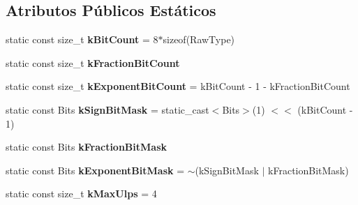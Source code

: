 \subsection*{Atributos Públicos Estáticos}
\begin{DoxyCompactItemize}
\item 
\hypertarget{classtesting_1_1internal_1_1FloatingPoint_ab819d2e8f93e9e482373999f0f8d71b9}{static const size\-\_\-t {\bfseries k\-Bit\-Count} = 8$\ast$sizeof(Raw\-Type)}\label{classtesting_1_1internal_1_1FloatingPoint_ab819d2e8f93e9e482373999f0f8d71b9}

\item 
static const size\-\_\-t {\bfseries k\-Fraction\-Bit\-Count}
\item 
\hypertarget{classtesting_1_1internal_1_1FloatingPoint_a1973d843c00781053d3073daa8a40119}{static const size\-\_\-t {\bfseries k\-Exponent\-Bit\-Count} = k\-Bit\-Count -\/ 1 -\/ k\-Fraction\-Bit\-Count}\label{classtesting_1_1internal_1_1FloatingPoint_a1973d843c00781053d3073daa8a40119}

\item 
\hypertarget{classtesting_1_1internal_1_1FloatingPoint_aca98b5ea6f2222a66a82e52421682efa}{static const Bits {\bfseries k\-Sign\-Bit\-Mask} = static\-\_\-cast$<$Bits$>$(1) $<$$<$ (k\-Bit\-Count -\/ 1)}\label{classtesting_1_1internal_1_1FloatingPoint_aca98b5ea6f2222a66a82e52421682efa}

\item 
static const Bits {\bfseries k\-Fraction\-Bit\-Mask}
\item 
\hypertarget{classtesting_1_1internal_1_1FloatingPoint_a66065dfc4d5f41100f686159637af23b}{static const Bits {\bfseries k\-Exponent\-Bit\-Mask} = $\sim$(k\-Sign\-Bit\-Mask $\vert$ k\-Fraction\-Bit\-Mask)}\label{classtesting_1_1internal_1_1FloatingPoint_a66065dfc4d5f41100f686159637af23b}

\item 
\hypertarget{classtesting_1_1internal_1_1FloatingPoint_aac498b3714d93f8e88cdc30e4c5935f6}{static const size\-\_\-t {\bfseries k\-Max\-Ulps} = 4}\label{classtesting_1_1internal_1_1FloatingPoint_aac498b3714d93f8e88cdc30e4c5935f6}

\end{DoxyCompactItemize}


